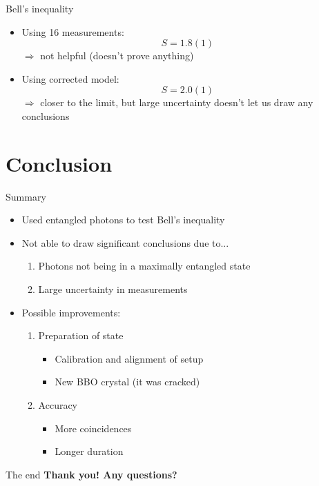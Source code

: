 \documentclass{../talk}
\begin{document}
\begin{frame}{Bell's inequality}
  \begin{itemize}
    \item Using 16 measurements:
      \begin{equation}
        S = 1.8(1)
      \end{equation}
      $\Rightarrow$ not helpful (doesn't prove anything)
    \item<2-> Using corrected model:
      \begin{equation}
        S = 2.0(1)
      \end{equation}
      $\Rightarrow$ closer to the limit, but large uncertainty doesn't let us draw any conclusions
  \end{itemize}
\end{frame}

\section{Conclusion}

\begin{frame}{Summary}
  \begin{itemize}
    \item Used entangled photons to test Bell's inequality
    \item Not able to draw significant conclusions due to...
      \begin{enumerate}
        \item Photons not being in a maximally entangled state
        \item Large uncertainty in measurements
      \end{enumerate}
    \item<2-> Possible improvements:
      \begin{enumerate}
        \item Preparation of state
          \begin{itemize}
            \item Calibration and alignment of setup
            \item New BBO crystal (it was cracked)
          \end{itemize}
        \item Accuracy
          \begin{itemize}
            \item More coincidences
            \item Longer duration
          \end{itemize}
      \end{enumerate}
  \end{itemize}
\end{frame}

\begin{frame}{The end}
  \textbf{\Large Thank you! Any questions?}
  
  \hrulefill
\end{frame}
\end{document}
